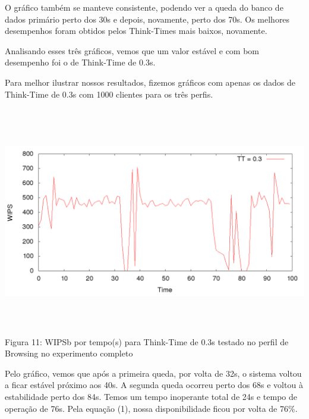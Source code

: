 \documentclass[11pt,twoside]{article}
\begin{document}
O gráfico também se manteve consistente, podendo ver a queda do banco de dados primário perto dos 30s e depois, novamente, perto dos 70s.  Os melhores desempenhos foram obtidos pelos Think-Times mais baixos, novamente.

Analisando esses três gráficos, vemos que um valor estável e com bom desempenho foi o de Think-Time de 0.3s.

Para melhor ilustrar nossos resultados, fizemos gráficos com apenas os dados de Think-Time de 0.3s com 1000 clientes para os três perfis.

\begin{center}
\includegraphics[width=15cm, height=10cm]{images/completo/plot_browsing_TT03.png}
Figura 11: WIPSb por tempo(s) para Think-Time de 0.3s testado no perfil de Browsing no experimento completo
\end{center}

Pelo gráfico, vemos que após a primeira queda, por volta de 32s, o sistema voltou a ficar estável próximo aos 40s. A segunda queda ocorreu perto dos 68s e voltou à estabilidade perto dos 84s. Temos um tempo inoperante total de 24s e tempo de operação de 76s. Pela equação (1), nossa disponibilidade ficou por volta de 76\%.
\end{document}
